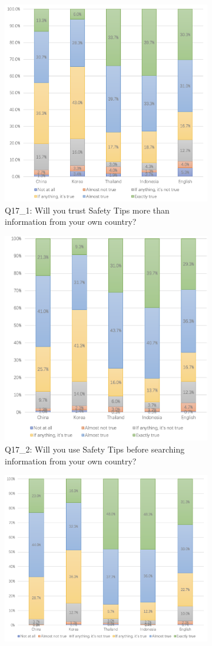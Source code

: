 \begin{figure}[h]
  \begin{subfigure}{0.48\textwidth}
  \includegraphics[width=0.6\linewidth]{Figure/Figure15.jpg}
  \centering
  \caption{Q17\_1: Will you trust Safety Tips more than information from your own country?}
  \label{fig15}
  \end{subfigure}\hfill
  \begin{subfigure}{0.48\textwidth}
  \includegraphics[width=0.6\linewidth]{Figure/Figure16.jpg}
  \centering
  \caption{Q17\_2: Will you use Safety Tips before searching information from your own country?}
  \label{fig16}
  \end{subfigure}
  \begin{subfigure}{0.48\textwidth}
  \includegraphics[width=0.6\linewidth]{Figure/Figure17.jpg}

\end{subfigure}
\end{figure}
